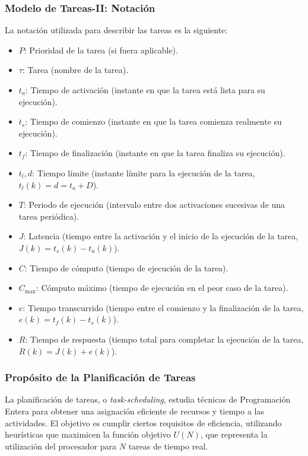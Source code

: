 \documentclass[a4paper,12pt]{article}
\begin{document}
\subsubsection{Modelo de Tareas-II: Notación}

La notación utilizada para describir las tareas es la siguiente:

\begin{itemize}
    \item \(P\): Prioridad de la tarea (si fuera aplicable).
    \item \(\tau\): Tarea (nombre de la tarea).
    \item \(t_a\): Tiempo de activación (instante en que la tarea está lista para su ejecución).
    \item \(t_s\): Tiempo de comienzo (instante en que la tarea comienza realmente su ejecución).
    \item \(t_f\): Tiempo de finalización (instante en que la tarea finaliza su ejecución).
    \item \(t_l, d\): Tiempo límite (instante límite para la ejecución de la tarea, \(t_l(k) = d = t_a + D\)).
    \item \(T\): Periodo de ejecución (intervalo entre dos activaciones sucesivas de una tarea periódica).
    \item \(J\): Latencia (tiempo entre la activación y el inicio de la ejecución de la tarea, \(J(k) = t_s(k) - t_a(k)\)).
    \item \(C\): Tiempo de cómputo (tiempo de ejecución de la tarea).
    \item \(C_{\text{max}}\): Cómputo máximo (tiempo de ejecución en el peor caso de la tarea).
    \item \(e\): Tiempo transcurrido (tiempo entre el comienzo y la finalización de la tarea, \(e(k) = t_f(k) - t_s(k)\)).
    \item \(R\): Tiempo de respuesta (tiempo total para completar la ejecución de la tarea, \(R(k) = J(k) + e(k)\)).
\end{itemize}

\subsubsection{Propósito de la Planificación de Tareas}

La planificación de tareas, o \textit{task-scheduling}, estudia técnicas de Programación Entera para obtener una asignación eficiente de recursos y tiempo a las actividades. El objetivo es cumplir ciertos requisitos de eficiencia, utilizando heurísticas que maximicen la función objetivo \(U(N)\), que representa la utilización del procesador para \(N\) tareas de tiempo real.
\end{document}
